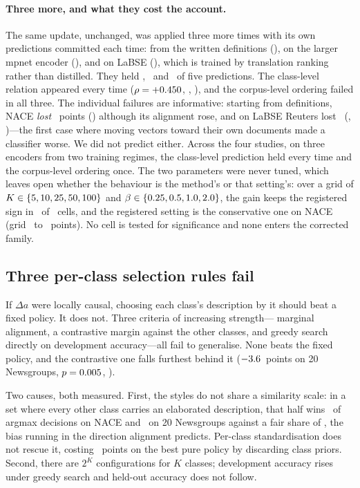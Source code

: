 \documentclass[11pt]{article}
\begin{document}
\paragraph{Three more, and what they cost the account.} The same update,
unchanged, was applied three more times with its own predictions committed each
time: from the written definitions (\RocchioDefRegistered), on the larger mpnet
encoder (\RocchioMpnetRegistered), and on LaBSE
(\RocchioLabseRegistered), which is trained by translation ranking rather than
distilled. They held \RocchioDefHeld, \RocchioMpnetHeld\ and
\RocchioLabseHeld\ of five predictions. The class-level relation appeared every
time ($\rho = +0.450$, \RocchioMpnetRho, \RocchioLabseRho), and the
corpus-level ordering failed in all three. The individual failures are
informative: starting from definitions, NACE \emph{lost}
\RocchioDefNaceGain~points (\RocchioDefNacePStat) although its alignment rose,
and on LaBSE Reuters lost \RocchioLabseReutersGain\
(\RocchioLabseReutersPStat, \HolmLabseReutersStat)---the first case where
moving vectors toward their own documents made a classifier worse. We did not
predict either. Across the four studies, on three encoders from two training
regimes, the class-level prediction held every time and the corpus-level
ordering once.
The two parameters were never tuned, which leaves open whether the behaviour is
the method's or that setting's: over a grid of $K \in \{5, 10, 25, 50, 100\}$ and
$\beta \in \{0.25, 0.5, 1.0, 2.0\}$, the gain keeps the registered sign in
\SweepAgreeing\ of \SweepCells\ cells, and the registered setting is the
conservative one on NACE (grid \SweepNaceMin\ to \SweepNaceMax~points). No
cell is tested for significance and none enters the corrected family.

\subsection{Three per-class selection rules fail}

If $\Delta a$ were locally causal, choosing each class's description by it should
beat a fixed policy. It does not. Three criteria of increasing strength---
marginal alignment, a contrastive margin against the other classes, and greedy
search directly on development accuracy---all fail to generalise. None beats
the fixed policy, and the contrastive one falls furthest behind it
($-3.6$~points on 20 Newsgroups,
$p = 0.005$, \HolmContrastiveStat).

Two causes, both measured. First, the styles do not share a similarity scale: in
a set where every other class carries an elaborated description, that half wins
\ElabShareNACE\ of argmax decisions on NACE and \ElabShareNews\ on 20 Newsgroups
against a fair share of \FairShare, the bias running in the direction alignment
predicts. Per-class standardisation does not rescue it, costing \ZScoreCost~points
on the best pure policy by discarding class priors. Second, there are $2^K$ configurations for $K$ classes;
development accuracy rises under greedy search and held-out accuracy does not
follow.
\end{document}
